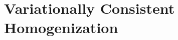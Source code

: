 \documentclass[ExampleMasters.tex]{subfiles}
\begin{document}
%   
%     
% 


\section{Variationally Consistent Homogenization}



\end{document}
